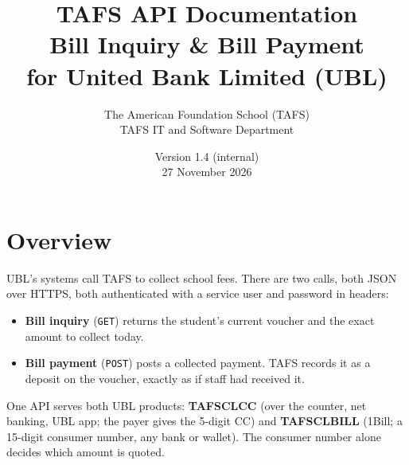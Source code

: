 \documentclass[11pt]{article}
\title{\textbf{TAFS API Documentation} \\[4pt]
\large Bill Inquiry \& Bill Payment \\ for United Bank Limited (UBL)}
\author{The American Foundation School (TAFS) \\ TAFS IT and Software Department}
\date{Version 1.4 (internal) \\ 27 November 2026}
\begin{document}
\begin{titlepage}
\vspace*{\fill}
{\let\newpage\relax\maketitle}
\thispagestyle{empty}
\vspace*{\fill}
\internalonly
\end{titlepage}

\tableofcontents
\newpage

\section{Overview}
UBL's systems call TAFS to collect school fees. There are two calls, both JSON over HTTPS, both authenticated with a
service user and password in headers:
\begin{itemize}[nosep]
  \item \textbf{Bill inquiry} (\texttt{GET}) returns the student's current voucher and the exact amount to collect today.
  \item \textbf{Bill payment} (\texttt{POST}) posts a collected payment. TAFS records it as a deposit on the voucher,
        exactly as if staff had received it.
\end{itemize}
One API serves both UBL products: \textbf{TAFSCLCC} (over the counter, net banking, UBL app; the payer gives the
5-digit CC) and \textbf{TAFSCLBILL} (1Bill; a 15-digit consumer number, any bank or wallet). The consumer number alone
decides which amount is quoted.


\end{document}
